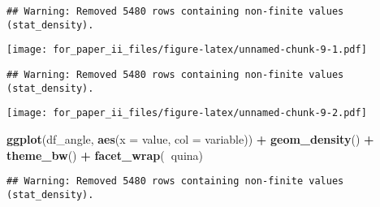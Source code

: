\documentclass[]{article}
\newenvironment{Shaded}{\begin{snugshade}}{\end{snugshade}}
\newcommand{\KeywordTok}[1]{\textcolor[rgb]{0.13,0.29,0.53}{\textbf{#1}}}
\newcommand{\DataTypeTok}[1]{\textcolor[rgb]{0.13,0.29,0.53}{#1}}
\newcommand{\StringTok}[1]{\textcolor[rgb]{0.31,0.60,0.02}{#1}}
\newcommand{\OperatorTok}[1]{\textcolor[rgb]{0.81,0.36,0.00}{\textbf{#1}}}
\newcommand{\NormalTok}[1]{#1}
\begin{document}
\begin{verbatim}
## Warning: Removed 5480 rows containing non-finite values (stat_density).
\end{verbatim}

\texttt{[image: for\_paper\_ii\_files/figure-latex/unnamed-chunk-9-1.pdf]}

\begin{Shaded}
\end{Shaded}

\begin{verbatim}
## Warning: Removed 5480 rows containing non-finite values (stat_density).
\end{verbatim}

\texttt{[image: for\_paper\_ii\_files/figure-latex/unnamed-chunk-9-2.pdf]}

\begin{Shaded}
\begin{Highlighting}[]
\KeywordTok{ggplot}\NormalTok{(df_angle, }\KeywordTok{aes}\NormalTok{(}\DataTypeTok{x =}\NormalTok{ value, }\DataTypeTok{col =}\NormalTok{ variable)) }\OperatorTok{+}\StringTok{ }\KeywordTok{geom_density}\NormalTok{() }\OperatorTok{+}\StringTok{ }\KeywordTok{theme_bw}\NormalTok{() }\OperatorTok{+}\StringTok{ }\KeywordTok{facet_wrap}\NormalTok{(}\OperatorTok{~}\NormalTok{quina)}
\end{Highlighting}
\end{Shaded}

\begin{verbatim}
## Warning: Removed 5480 rows containing non-finite values (stat_density).
\end{verbatim}
\end{document}
